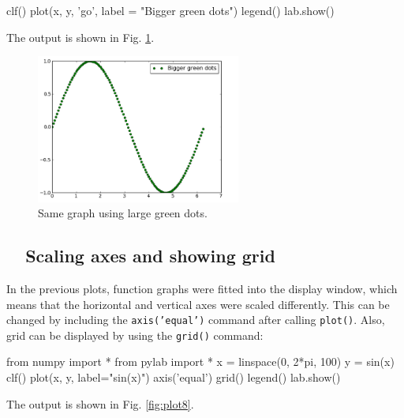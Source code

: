 \begin{bluecode}
clf()
plot(x, y, 'go', label = "Bigger green dots")
legend()
lab.show()
\end{bluecode}
\noindent
The output is shown in Fig. \ref{fig:plot5}.
\newpage

\begin{figure}[!ht]
\begin{center}
\includegraphics[width=0.6\textwidth]{imgp/plot5.png}
\end{center}
\vspace{-6mm}
\caption{Same graph using large green dots.}
\label{fig:plot5}
\end{figure}
\noindent

\subsection{\ \ Scaling axes and showing grid}

In the previous plots, function graphs were fitted into the 
display window, which means that the horizontal and vertical 
axes were scaled differently. This can be changed by including the 
{\tt axis('equal')} command after calling {\tt plot()}. Also, 
grid can be displayed by using the {\tt grid()} command:

\begin{bluecode}
from numpy import *
from pylab import *
x = linspace(0, 2*pi, 100)
y = sin(x)
clf()
plot(x, y, label="sin(x)")
axis('equal')
grid()
legend()
lab.show()
\end{bluecode}
\noindent
The output is shown in Fig. \ref{fig:plot8}.
\newpage

